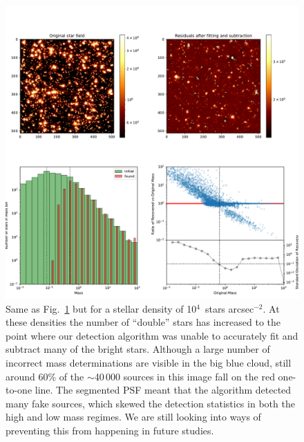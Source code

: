\documentclass[referee]{aa}
\newcommand{\s}{$\sim$}
\newcommand{\h}[1]{$^{#1}$}
\newcommand{\spae}{stars arcsec$^{-2}$}
\begin{document}
\begin{appendix}
\begin{figure}
    \label{fig:results_lmc_1E3}
\end{figure}


\begin{figure}

    \centering
    \includegraphics[width=\textwidth]{tbl_stats_dist=50000_rho=10000.pdf}
    \caption{Same as Fig.~\ref{fig:results_lmc_1E3} but for a stellar density of 10\h4~\spae.
    At these densities the number of ``double'' stars has increased to the point where our detection algorithm was unable to accurately fit and subtract many of the bright stars.
    Although a large number of incorrect mass determinations are visible in the big blue cloud, still around 60\% of the \s40\,000 sources in this image fall on the red one-to-one line.
    The segmented PSF meant that the algorithm detected many fake sources, which skewed the detection statistics in both the high and low mass regimes.
    We are still looking into ways of preventing this from happening in future studies.}

    \label{fig:results_lmc_1E4}

\end{figure}

\end{appendix}





\end{document}
